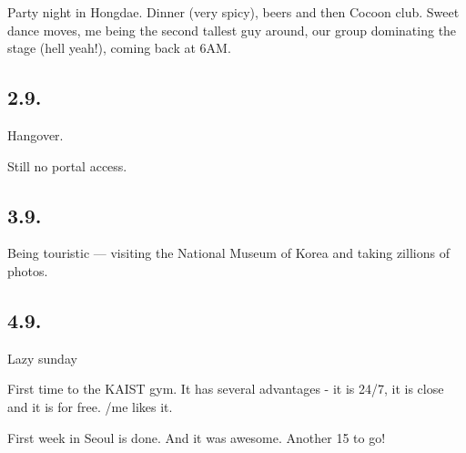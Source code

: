 \begin{post}
\begin{content}
\begin{itemize*}
	\item Party night in Hongdae. Dinner (very spicy), beers and then Cocoon club. Sweet dance moves, me being the second tallest guy around, our group dominating the stage (hell yeah!), coming back at 6AM.

\end{itemize*}



\subsection{2.9.}



\begin{itemize*}

	\item Hangover.

	\item Still no portal access.

\end{itemize*}

\subsection{3.9.}

\begin{itemize*}

	\item Being touristic --- visiting the National Museum of Korea and taking zillions of photos.

\end{itemize*}

\subsection{4.9.}
\begin{itemize*}

	\item Lazy sunday

	\item First time to the KAIST gym. It has several advantages - it is 24/7, it is close and it is for free. /me likes it.

	\item First week in Seoul is done. And it was awesome. Another 15 to go!

\end{itemize*}
	\end{content}
\end{post}

